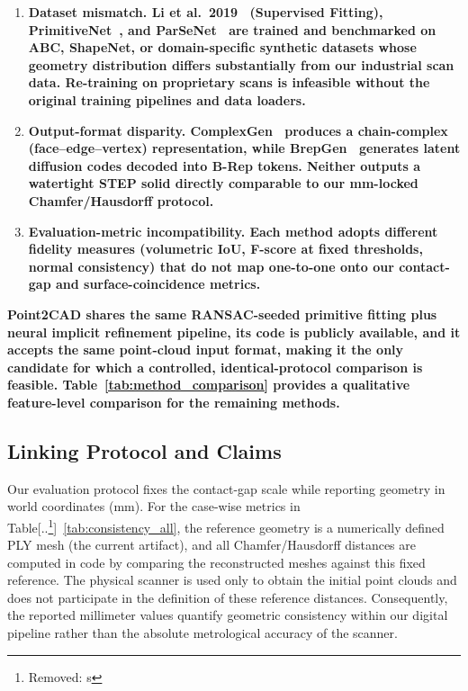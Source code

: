 \documentclass{ieeeaccess}
\providecommand{\DIFaddtex}[1]{{\color{blue}\bfseries #1}} %
\providecommand{\DIFdeltex}[1]{{\color{red}[..\footnote{\color{black}Removed: #1}]}} %
\providecommand{\DIFaddend}{} %
\providecommand{\DIFdelbegin}{} %
\providecommand{\DIFdelend}{} %
\providecommand{\DIFadd}[1]{\texorpdfstring{\DIFaddtex{#1}}{#1}} %
\providecommand{\DIFdel}[1]{\texorpdfstring{\DIFdeltex{#1}}{}} %
\begin{document}
\begin{enumerate}
  \item \DIFadd{\textbf{Dataset mismatch.}
        Li et al.\ 2019~\cite{b27} (Supervised Fitting), PrimitiveNet~\cite{b28},
        and ParSeNet~\cite{b19}
        are trained and benchmarked on
        ABC, ShapeNet, or domain-specific synthetic datasets whose
        geometry distribution differs substantially from our
        industrial scan data.
        Re-training on proprietary scans is infeasible without the
        original training pipelines and data loaders.
  }\item \DIFadd{\textbf{Output-format disparity.}
        ComplexGen~\cite{b1} produces a chain-complex (face--edge--vertex)
        representation, while BrepGen~\cite{b4} generates latent
        diffusion codes decoded into B-Rep tokens.
        Neither outputs a watertight STEP solid directly comparable
        to our mm-locked Chamfer/Hausdorff protocol.
  }\item \DIFadd{\textbf{Evaluation-metric incompatibility.}
        Each method adopts different fidelity measures
        (volumetric IoU, F-score at fixed thresholds, normal
        consistency) that do not map one-to-one onto our
        contact-gap and surface-coincidence metrics.
}\end{enumerate}

\DIFadd{Point2CAD shares the same RANSAC-seeded primitive fitting plus neural
implicit refinement pipeline, its code is publicly available, and it
accepts the same point-cloud input format, making it the only candidate
for which a controlled, identical-protocol comparison is feasible.
Table~\ref{tab:method_comparison} provides a qualitative
feature-level comparison for the remaining methods.
}

\DIFaddend \subsection{Linking Protocol and Claims}
Our evaluation protocol fixes the contact-gap scale while reporting geometry in world coordinates (mm).
For the case-wise metrics in Table\DIFdelbegin \DIFdel{s}\DIFdelend  ~\ref{tab:consistency_all}, the reference geometry is a numerically defined PLY mesh (the current artifact), and all Chamfer/Hausdorff distances are computed in code by comparing the reconstructed meshes against this fixed reference.
The physical scanner is used only to obtain the initial point clouds and does not participate in the definition of these reference distances.
Consequently, the reported millimeter values quantify geometric consistency within our digital pipeline rather than the absolute metrological accuracy of the scanner.
\end{document}
